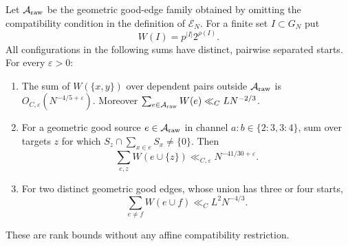 \begin{proposition}
\label{p1:arith:fixed-homogeneous-seeds}
Let $\mathcal A_{\rm raw}$ be the geometric good-edge family obtained by
omitting the compatibility condition in the definition of $\mathcal E_N$.
For a finite set $I\subset G_N$ put
\[
 W(I)=p^{|I|}2^{\rho(I)}.
\]
All configurations in the following sums have distinct, pairwise separated
starts.  For every $\varepsilon>0$:
\begin{enumerate}
\item The sum of $W(\{x,y\})$ over dependent pairs outside
$\mathcal A_{\rm raw}$ is $O_{C,\varepsilon}(N^{-4/5+\varepsilon})$.
Moreover $\sum_{e\in\mathcal A_{\rm raw}}W(e)\ll_C LN^{-2/3}$.
\item For a geometric good source $e\in\mathcal A_{\rm raw}$ in channel
$a:b\in\{2:3,3:4\}$, sum over targets $z$ for which
$S_z\cap\sum_{x\in e}S_x\ne\{0\}$. Then
\[
 \sum_{e,z}W(e\cup\{z\})\ll_{C,\varepsilon}N^{-41/30+\varepsilon}.
\]
\item For two distinct geometric good edges, whose union has three or
four starts,
\[
 \sum_{e\ne f}W(e\cup f)
 \ll_C L^2N^{-4/3}.
\]
\end{enumerate}
These are rank bounds without any affine compatibility restriction.
\end{proposition}

